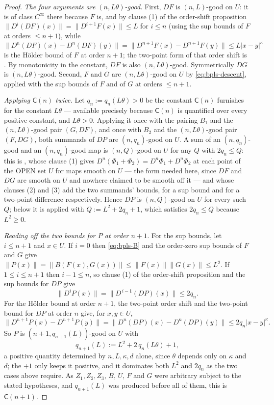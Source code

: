 \begin{proof}
\medskip\noindent\emph{The four arguments are $(n,L\theta)$-good.}
First, $DF$ is $(n,L)$-good on $U$: it is of class $C^{\infty}$ there because $F$ is, and by
clause (1) of the order-shift proposition $\lVert D^{i}(DF)(x)\rVert=\lVert D^{i+1}F(x)\rVert\le
L$ for $i\le n$ (using the sup bounds of $F$ at orders $\le n+1$), while
$\lVert D^{n}(DF)(x)-D^{n}(DF)(y)\rVert=\lVert D^{n+1}F(x)-D^{n+1}F(y)\rVert
 \le L\lvert x-y\rvert^{\kappa}$ is the H\"older bound of $F$ at order $n+1$; the two-point form
of that order shift is .  By monotonicity in the constant,
$DF$ is also $(n,L\theta)$-good.  Symmetrically $DG$ is $(n,L\theta)$-good.  Second, $F$ and $G$
are $(n,L\theta)$-good on $U$ by \eqref{eq:bpls-descent}, applied with the sup bounds of $F$ and
of $G$ at orders $\le n+1$.

\medskip\noindent\emph{Applying $\mathsf{C}(n)$ twice.}
Let $q_n:=q_n(L\theta)>0$ be the constant $\mathsf{C}(n)$ furnishes for the constant $L\theta$ ---
available precisely because $\mathsf{C}(n)$ is quantified over every positive constant, and
$L\theta>0$.  Applying it once with the pairing $B_1$ and the $(n,L\theta)$-good pair $(G,DF)$,
and once with $B_2$ and the $(n,L\theta)$-good pair $(F,DG)$, both summands of $DP$ are
$(n,q_n)$-good on $U$.  A sum of an $(n,q_n)$-good and an $(n,q_n)$-good map is
$(n,Q)$-good on $U$ for any $Q$ with $2q_n\le Q$: this is , whose clause
(1) gives $D^{n}(\Phi_1+\Phi_2)=D^{n}\Phi_1+D^{n}\Phi_2$ at each point of the OPEN set $U$ for
maps smooth on $U$ --- the form needed here, since $DF$ and $DG$ are smooth on $U$ and nowhere
claimed to be smooth off it --- and whose clauses (2) and (3) add the two summands' bounds, for
a sup bound and for a two-point difference respectively.  Hence $DP$ is $(n,Q)$-good on $U$ for
every such $Q$; below it is applied with $Q:=L^{2}+2q_n+1$, which satisfies $2q_n\le Q$ because
$L^{2}\ge0$.

\medskip\noindent\emph{Reading off the two bounds for $P$ at order $n+1$.}
For the sup bounds, let $i\le n+1$ and $x\in U$.  If $i=0$ then \eqref{eq:bpls-B} and the
order-zero sup bounds of $F$ and $G$ give
$\lVert P(x)\rVert=\lVert B(F(x),G(x))\rVert\le\lVert F(x)\rVert\lVert G(x)\rVert\le L^{2}$.  If
$1\le i\le n+1$ then $i-1\le n$, so clause (1) of the order-shift proposition and the sup bounds
for $DP$ give
\[
  \bigl\lVert D^{i}P(x)\bigr\rVert=\bigl\lVert D^{\,i-1}(DP)(x)\bigr\rVert\le2q_n .
\]
For the H\"older bound at order $n+1$, the two-point order shift
 and the two-point bound for $DP$ at order $n$ give, for
$x,y\in U$,
\[
  \bigl\lVert D^{n+1}P(x)-D^{n+1}P(y)\bigr\rVert
  =\bigl\lVert D^{n}(DP)(x)-D^{n}(DP)(y)\bigr\rVert\le2q_n\lvert x-y\rvert^{\kappa}.
\]
So $P$ is $(n+1,q_{n+1}(L))$-good on $U$ with
\[
  q_{n+1}(L):=L^{2}+2\,q_n(L\theta)+1,
\]
a positive quantity determined by $n,L,\kappa,d$ alone, since $\theta$ depends only on $\kappa$
and $d$; the $+1$ only keeps it positive, and it dominates both $L^{2}$ and $2q_n$ as the two
cases above require.  As $Z_1,Z_2,Z_3$, $B$, $U$, $F$ and $G$ were arbitrary subject to the
stated hypotheses, and $q_{n+1}(L)$ was produced before all of them, this is $\mathsf{C}(n+1)$.
\end{proof}
